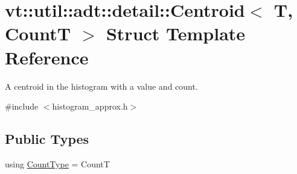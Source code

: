 \hypertarget{structvt_1_1util_1_1adt_1_1detail_1_1_centroid}{}\section{vt\+:\+:util\+:\+:adt\+:\+:detail\+:\+:Centroid$<$ T, CountT $>$ Struct Template Reference}
\label{structvt_1_1util_1_1adt_1_1detail_1_1_centroid}


A centroid in the histogram with a value and count.  




{\ttfamily \#include $<$histogram\+\_\+approx.\+h$>$}

\subsection*{Public Types}
\begin{DoxyCompactItemize}
\item 
using \hyperlink{structvt_1_1util_1_1adt_1_1detail_1_1_centroid_ac3815361e4f13eeb8b2863d2eb8db1dd}{Count\+Type} = CountT
\end{DoxyCompactItemize}
